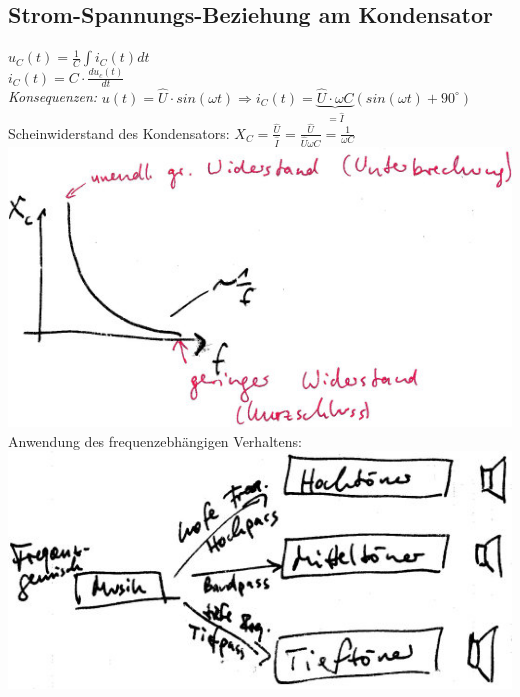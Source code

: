 \subsection{Strom-Spannungs-Beziehung am Kondensator}
$u_C(t)=\frac{1}{C}\int i_C(t) dt$\\
$i_C(t)=C\cdot \frac{du_c(t)}{dt}$\\
\emph{Konsequenzen:} $u(t)=\hat{U}\cdot sin (\omega t) \Rightarrow i_C(t)=\underbrace{\hat{U}\cdot \omega C}_{=\hat{I}}(sin (\omega t) + 90^{\circ})$\\
Scheinwiderstand des Kondensators: $X_C=\frac{\hat{U}}{\hat{I}}=\frac{\hat{U}}{\hat{U}\omega C}=\frac{1}{\omega C}$\\
\includegraphics[scale=1.5]{Abbildungen/ABB408}\\
Anwendung des frequenzebhängigen Verhaltens:\\
\includegraphics[scale=1.5]{Abbildungen/ABB409}





